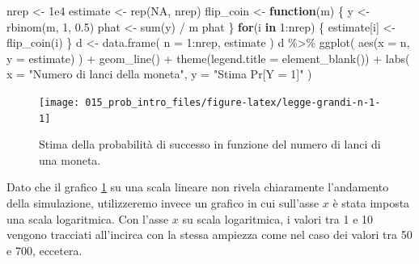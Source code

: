 \documentclass[
  10pt,
  italian,
  a4paper,
  extrafontsizes,onecolumn,openright
  ]{memoir}
\newenvironment{Shaded}{\begin{snugshade}}{\end{snugshade}}
\newcommand{\AttributeTok}[1]{\textcolor[rgb]{0.77,0.63,0.00}{#1}}
\newcommand{\ConstantTok}[1]{\textcolor[rgb]{0.00,0.00,0.00}{#1}}
\newcommand{\ControlFlowTok}[1]{\textcolor[rgb]{0.13,0.29,0.53}{\textbf{#1}}}
\newcommand{\DecValTok}[1]{\textcolor[rgb]{0.00,0.00,0.81}{#1}}
\newcommand{\FloatTok}[1]{\textcolor[rgb]{0.00,0.00,0.81}{#1}}
\newcommand{\FunctionTok}[1]{\textcolor[rgb]{0.00,0.00,0.00}{#1}}
\newcommand{\NormalTok}[1]{#1}
\newcommand{\OtherTok}[1]{\textcolor[rgb]{0.56,0.35,0.01}{#1}}
\newcommand{\SpecialCharTok}[1]{\textcolor[rgb]{0.00,0.00,0.00}{#1}}
\newcommand{\StringTok}[1]{\textcolor[rgb]{0.31,0.60,0.02}{#1}}
\theoremstyle{definition}
\theoremstyle{definition}
\theoremstyle{definition}
\theoremstyle{definition}
\theoremstyle{remark}
\begin{document}
\begin{Shaded}
\begin{Highlighting}[]
\NormalTok{nrep }\OtherTok{\textless{}{-}} \FloatTok{1e4}
\NormalTok{estimate }\OtherTok{\textless{}{-}} \FunctionTok{rep}\NormalTok{(}\ConstantTok{NA}\NormalTok{, nrep)}
\NormalTok{flip\_coin }\OtherTok{\textless{}{-}} \ControlFlowTok{function}\NormalTok{(m) \{}
\NormalTok{  y }\OtherTok{\textless{}{-}} \FunctionTok{rbinom}\NormalTok{(m, }\DecValTok{1}\NormalTok{, }\FloatTok{0.5}\NormalTok{)}
\NormalTok{  phat }\OtherTok{\textless{}{-}} \FunctionTok{sum}\NormalTok{(y) }\SpecialCharTok{/}\NormalTok{ m}
\NormalTok{  phat}
\NormalTok{\}}
\ControlFlowTok{for}\NormalTok{(i }\ControlFlowTok{in} \DecValTok{1}\SpecialCharTok{:}\NormalTok{nrep) \{}
\NormalTok{  estimate[i] }\OtherTok{\textless{}{-}} \FunctionTok{flip\_coin}\NormalTok{(i)}
\NormalTok{\}}
\NormalTok{d }\OtherTok{\textless{}{-}} \FunctionTok{data.frame}\NormalTok{(}
  \AttributeTok{n =} \DecValTok{1}\SpecialCharTok{:}\NormalTok{nrep, }
\NormalTok{  estimate}
\NormalTok{)}
\NormalTok{d }\SpecialCharTok{\%\textgreater{}\%} 
  \FunctionTok{ggplot}\NormalTok{(}
    \FunctionTok{aes}\NormalTok{(}\AttributeTok{x =}\NormalTok{ n, }\AttributeTok{y =}\NormalTok{ estimate)}
\NormalTok{  ) }\SpecialCharTok{+}
  \FunctionTok{geom\_line}\NormalTok{() }\SpecialCharTok{+}
  \FunctionTok{theme}\NormalTok{(}\AttributeTok{legend.title =} \FunctionTok{element\_blank}\NormalTok{()) }\SpecialCharTok{+}
  \FunctionTok{labs}\NormalTok{(}
    \AttributeTok{x =} \StringTok{"Numero di lanci della moneta"}\NormalTok{, }
    \AttributeTok{y =} \StringTok{"Stima Pr[Y = 1]"}
\NormalTok{)}
\end{Highlighting}
\end{Shaded}

\begin{figure}[h]

{\centering \texttt{[image: 015\_prob\_intro\_files/figure-latex/legge-grandi-n-1-1]} 

}

\caption{Stima della probabilità di successo in funzione del numero di lanci di una moneta.}\label{fig:legge-grandi-n-1}
\end{figure}

Dato che il grafico \ref{fig:legge-grandi-n-1} su una scala lineare non rivela chiaramente l'andamento della simulazione, utilizzeremo invece un grafico in cui sull'asse \(x\) è stata imposta una scala logaritmica. Con l'asse \(x\) su scala logaritmica, i valori tra 1 e 10 vengono tracciati all'incirca con la stessa ampiezza come nel caso dei valori tra 50 e 700, eccetera.
\end{document}
